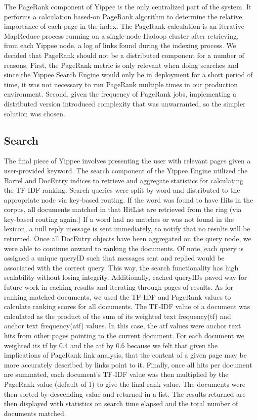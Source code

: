 \documentclass[11pt, letterpaper, oneside, twocolumn]{article}
\begin{document}
The PageRank component of Yippee is the only centralized part of the system.
It performs a calculation based-on PageRank algorithm\cite{pagerank} to determine the relative importance of each page in the index.
The PageRank calculation is an iterative MapReduce process running on a single-node Hadoop cluster after retrieving, from each Yippee node, a log of links found during the indexing process.
We decided that PageRank should not be a distributed component for a number of  reasons. 
First, the PageRank metric is only relevant when doing searches and since the Yippee Search Engine would only be in deployment for a short period of time, it was not necessary to run PageRank multiple times in our production environment.
Second, given the frequency of PageRank jobs, implementing a distributed version introduced complexity that was unwarranted, so the simpler solution was chosen.

\subsection{Search}
The final piece of Yippee involves presenting the user with relevant pages given a user-provided keyword.
The search component of the Yippee Engine utilized the Barrel and DocEntry indices to retrieve and aggregate statistics for calculating the TF-IDF ranking. 
Search queries were split by word and distributed to the appropriate node via key-based routing. 
If the word was found to have Hits in the corpus, all documents matched in that HitList are retrieved from the ring (via key-based routing again.) 
If a word had no matches or was not found in the lexicon, a null reply message is sent immediately, to notify that no results will be returned. 
Once all DocEntry objects have been aggregated on the query node, we were able to continue onward to ranking the documents. 
Of note, each query is assigned a unique queryID such that messages sent and replied would be associated with the correct query. 
This way, the search functionality has high scalability without losing integrity. 
Additionally, cached queryIDs paved way for future work in caching results and iterating through pages of results.
As for ranking matched documents, we used the TF-IDF and PageRank values to calculate ranking scores for all documents. 
The TF-IDF value of a document was calculated as the product of the sum of its weighted text frequency(tf) and anchor text frequency(atf) values. 
In this case, the atf values were anchor text hits from other pages pointing to the current document. For each document we weighted its tf by 0.4 and the atf by 0.6 because we felt that given the implications of PageRank link analysis, that the content of a given page may be more accurately described by links point to it. 
Finally, once all hits per document are summated, each document's TF-IDF value was then multiplied by the PageRank value (default of 1) to give the final rank value. 
The documents were then sorted by descending value and returned in a list.
The results returned are then displayed with statistics on search time elapsed and the total number of documents matched.
\end{document}
